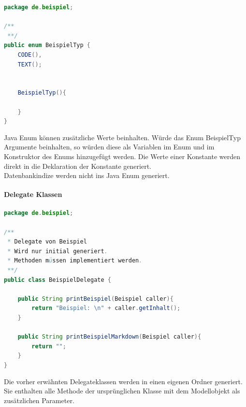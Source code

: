 \documentclass[./einleitung.tex]{subfiles}
\begin{document}
    \begin{lstlisting}[language=Java, caption=BeispielTyp.java, label=lst:beispielTypJava]
package de.beispiel;

/**
 **/
public enum BeispielTyp {
    CODE(),
    TEXT();


    BeispielTyp(){

    }
}
    \end{lstlisting}
    Java Enum können zusätzliche Werte beinhalten.
    Würde das Enum BeispielTyp Argumente beinhalten, so würden diese als Variablen im Enum und im Konstruktor des Enums hinzugefügt werden.
    Die Werte einer Konstante werden direkt in die Deklaration der Konstante generiert.\\
    Datenbankindize werden nicht ins Java Enum generiert.
    
    \paragraph{Delegate Klassen}
    \begin{lstlisting}[language=Java, caption=BeispielDelegate.java, label=lst:beispielDelegateJava]
package de.beispiel;

/**
 * Delegate von Beispiel
 * Wird nur initial generiert.
 * Methoden müssen implementiert werden.
 **/
public class BeispielDelegate {

    public String printBeispiel(Beispiel caller){
        return "Beispiel: \n" + caller.getInhalt();
    }

    public String printBeispielMarkdown(Beispiel caller){
        return "";
    }
}
    \end{lstlisting}
    Die vorher erwähnten Delegateklassen werden in einen eigenen Ordner generiert.
    Sie enthalten alle Methode der ursprünglichen Klasse mit dem Modellobjekt als zusätzlichen Parameter.
\end{document}
